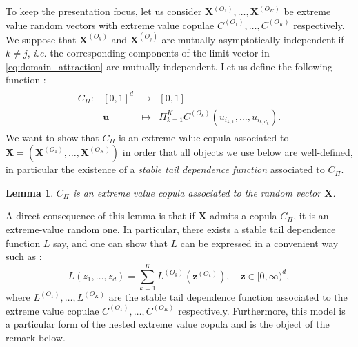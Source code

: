\documentclass[11pt]{article}
\newtheorem{lemma}{Lemma}
\begin{document}
	To keep the presentation focus, let us consider $\textbf{X}^{(O_1)}, \dots, \textbf{X}^{(O_K)}$ be extreme value random vectors with extreme value copulae $C^{(O_1)}, \dots, C^{(O_K)}$ respectively. We suppose that $\textbf{X}^{(O_k)}$ and $\textbf{X}^{(O_j)}$ are mutually asymptotically independent if $k \neq j$, \emph{i.e.} the corresponding components of the limit vector in \eqref{eq:domain_attraction} are mutually independent. Let us define the following function :
	\begin{align*}
		\begin{array}{lrcl}
C_\Pi : & [0,1]^d & \longrightarrow & [0,1] \\
    & \textbf{u} & \longmapsto & \Pi_{k=1}^K C^{(O_k)}(u_{i_{k,1}}, \dots, u_{i_{k,d_k}}). \end{array}
	\end{align*}
	We want to show that $C_\Pi$ is an extreme value copula associated to $\textbf{X} = (\textbf{X}^{(O_1)}, \dots, \textbf{X}^{(O_K)})$ in order that all objects we use below are well-defined, in particular the existence of a \emph{stable tail dependence function} associated to $C_\Pi$.
	\begin{lemma}
		\label{lem:Cevt}
		$C_\Pi$ is an extreme value copula associated to the random vector $\textbf{X}$.
	\end{lemma}
	
	A direct consequence of this lemma is that if $\textbf{X}$ admits a copula $C_\Pi$, it is an extreme-value random one. In particular, there exists a stable tail dependence function $L$ say, and one can show that $L$ can be expressed in a convenient way such as :
	\begin{equation}
		\label{eq:mutual_indep_stdf}
		L\left(z_1, \dots, z_d\right) = \sum_{k=1}^K L^{(O_k)}\left( \textbf{z}^{(O_k)} \right), \quad \textbf{z} \in [0,\infty)^d,
	\end{equation}
	where $L^{(O_1)}, \dots, L^{(O_K)}$ are the stable tail dependence function associated to the extreme value copulae $C^{(O_1)}, \dots, C^{(O_K)}$ respectively. Furthermore, this model is a particular form of the nested extreme value copula and is the object of the remark below.
	
\end{document}
